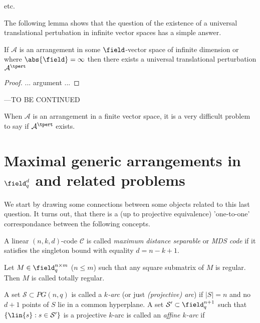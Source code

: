 \message{ !name(OnTheRAIDProblem.tex)}\documentclass[8pt,a4paper]{article}
\begin{document}
\begin{definition}
etc.
\end{definition}

The following lemma shows that the question of the existence of a universal translational pertubation in infinite vector spaces has a simple answer.

\begin{lemma}
If $\mathcal{A}$ is an arrangement in some $\field$-vector space of infinite dimension or where $\abs{\field}=\infty$ then there exists a universal translational perturbation $\mathcal{A}^{\tpert}$
\end{lemma}

\begin{proof}
... argument ...
\end{proof}

---TO BE CONTINUED


When $\mathcal{A}$ is an arrangement in a finite vector space, it is a very difficult problem to say if $\mathcal{A}^{\tpert}$ exists.

\section{Maximal generic arrangements in $\field_q^d$ and related problems}

We start by drawing some connections between some objects related to this last question.
It turns out, that there is a (up to projective equivalence) 'one-to-one' correspondance between the following concepts.

\begin{definition}
A linear $(n,k,d)$-code $\mathcal{C}$ is called \emph{maximum distance separable} or \emph{MDS code} if it satisfies the singleton bound with equality $d=n-k+1$. 
\end{definition}

\begin{definition}
Let $M\in\field_q^{n\times m}$ ($n\leq m$) such that any square submatrix of $M$ is regular. Then $M$ is called totally regular. 
\end{definition}

\begin{definition}[$k$-arc]
A set $\mathcal{S}\subset PG(n,q)$ is called a \emph{$k$-arc} (or just \emph{(projective) arc}) if $|S|=n$ and no $d+1$ points of $S$ lie in a common hyperplane.
A set $\mathcal{S}'\subset \field_q^{n+1}$ such that $\{\lin\{s\}:s\in\mathcal{S'}\}$ is a projective $k$-arc is called an \emph{affine $k$-arc} if 
\end{definition}
\end{document}
